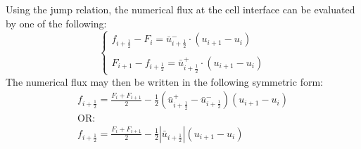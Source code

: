 \documentclass[11pt, a4paper]{article}
\begin{document}
Using the jump relation, the numerical flux at the cell interface can be evaluated by one of the following:
\begin{equation}
    \left\{\begin{array}{l}
        f_{i+\frac{1}{2}}-F_i = \bar{u}_{i+\frac{1}{2}}^-\cdot\left(u_{i+1}-u_i\right) \\\\
        F_{i+1}-f_{i+\frac{1}{2}}=\bar{u}_{i+\frac{1}{2}}^+\cdot\left(u_{i+1}-u_i\right)
    \end{array}\right.
\end{equation}
The numerical flux may then be written in the following symmetric form:
\begin{equation}
    \begin{array}{l}
        \displaystyle f_{i+\frac{1}{2}}=\frac{F_i+F_{i+1}}{2}-\frac{1}{2}\left(\bar{u}_{i+\frac{1}{2}}^+-\bar{u}_{i+\frac{1}{2}}^-\right)\left(u_{i+1}-u_i\right) \\
        \mathrm{OR:} \\
        \displaystyle f_{i+\frac{1}{2}}=\frac{F_i+F_{i+1}}{2}-\frac{1}{2}\left|\bar{u}_{i+\frac{1}{2}}\right|\left(u_{i+1}-u_i\right)
    \end{array}
\end{equation}

\end{document}
